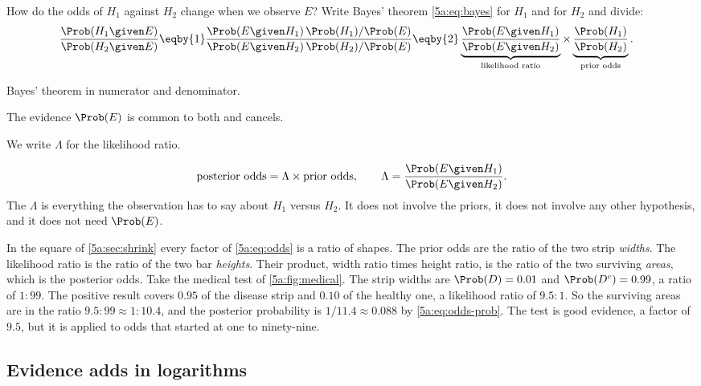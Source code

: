 How do the odds of $H_1$ against $H_2$ change when we observe $E$? Write Bayes'
theorem \eqref{5a:eq:bayes} for $H_1$ and for $H_2$ and divide:
\begin{align}
  \frac{\Prob(H_1\given E)}{\Prob(H_2\given E)}
  &\eqby{1}\frac{\Prob(E\given H_1)\,\Prob(H_1)/\Prob(E)}
               {\Prob(E\given H_2)\,\Prob(H_2)/\Prob(E)}
  \eqby{2}\underbrace{\frac{\Prob(E\given H_1)}{\Prob(E\given H_2)}}_{\text{likelihood ratio}}
   \times\underbrace{\frac{\Prob(H_1)}{\Prob(H_2)}}_{\text{prior odds}} .
  \label{5a:eq:odds}
\end{align}
\begin{explain}
  \item Bayes' theorem in numerator and denominator.
  \item The evidence $\Prob(E)$ is common to both and cancels.
\end{explain}
We write $\Lambda$ for the likelihood ratio.

\begin{keyidea}
\[
  \text{posterior odds}=\Lambda\times\text{prior odds},
  \qquad
  \Lambda=\frac{\Prob(E\given H_1)}{\Prob(E\given H_2)} .
\]
The  $\Lambda$ is everything the observation has to say
about $H_1$ versus $H_2$. It does not involve the priors, it does not involve any
other hypothesis, and it does not need $\Prob(E)$.
\end{keyidea}

In the square of \cref{5a:sec:shrink} every factor of \eqref{5a:eq:odds} is a ratio of
shapes. The prior odds are the ratio of the two strip \emph{widths}. The likelihood
ratio is the ratio of the two bar \emph{heights}. Their product, width ratio times
height ratio, is the ratio of the two surviving \emph{areas}, which is the posterior
odds. Take the medical test of \cref{5a:fig:medical}. The strip widths are
$\Prob(D)=0.01$ and $\Prob(D^c)=0.99$, a ratio of $1:99$. The positive result covers
$0.95$ of the disease strip and $0.10$ of the healthy one, a likelihood ratio of
$9.5:1$. So the surviving areas are in the ratio $9.5:99\approx1:10.4$, and the
posterior probability is $1/11.4\approx0.088$ by \eqref{5a:eq:odds-prob}. The test
is good evidence, a factor of $9.5$, but it is applied to odds that started at one
to ninety-nine.

\subsection{Evidence adds in logarithms}

